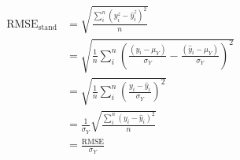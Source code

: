 \documentclass{article}
\begin{document}

\begin{equation}\label{eq:deriv_stand_rmse}
\begin{aligned}
    \text{RMSE}_{\text{stand}} &= \sqrt{\frac{\sum_i^n (y^z_i - \hat{y}^z_i)^2}{n}}\\
    &= \sqrt{\frac{1}{n}\sum_i^n \left(\frac{(y_i - \mu_Y)}{\sigma_Y} - \frac{(\hat{y}_i - \mu_Y)}{\sigma_Y}\right)^2}\\
    &= \sqrt{\frac{1}{n}\sum_i^n \left(\frac{y_i  - \hat{y}_i}{\sigma_Y}\right)^2}\\
    &= \frac{1}{\sigma_Y}\sqrt{\frac{\sum_i^n (y_i  - \hat{y}_i)^2}{n}}\\
    &= \frac{\text{RMSE}}{\sigma_Y}
\end{aligned}
\end{equation}
\end{document}
